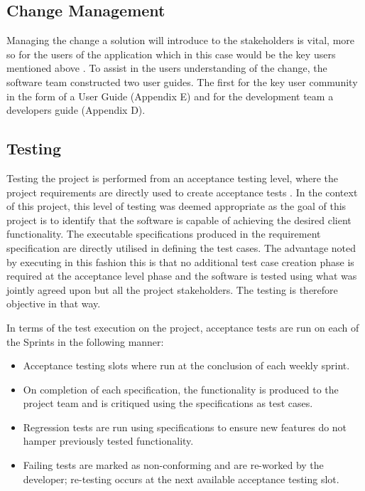 \documentclass[12pt]{witseiepaper}
\begin{document}
\subsection{Change Management}

Managing the change a solution will introduce to the stakeholders is vital, more so for the users of the application which in this case would be the key users mentioned above \cite{Change}. To assist in the users understanding of the change, the software team constructed two user guides. The first for the key user community in the form of a User Guide (Appendix E) and for the development team a developers guide (Appendix D).

\subsection{Testing}
Testing the project is performed from an acceptance testing level, where the project requirements are directly used to create acceptance tests \cite{AcceptanceTest}. In the context of this project, this level of testing was deemed appropriate as the goal of this project is to identify that the software is capable of achieving the desired client functionality.
The executable specifications produced in the requirement specification are directly utilised in defining the test cases. The advantage noted by executing in this fashion this is that no additional test case creation phase is required at the acceptance level phase and the software is tested using what was jointly agreed upon but all the project stakeholders. The testing is therefore objective in that way.

In terms of the test execution on the project, acceptance tests are run on each of the Sprints in the following manner:

\begin{itemize}
	\item Acceptance testing slots where run at the conclusion of each weekly sprint.
	\item On completion of each specification, the functionality is produced to the project team and is critiqued using the specifications as test cases.
	\item Regression tests are run using specifications to ensure new features do not hamper previously tested functionality.
	\item Failing tests are marked as non-conforming and are re-worked by the developer; re-testing occurs at the next available acceptance testing slot.\\ 
\end{itemize}	
\end{document}
